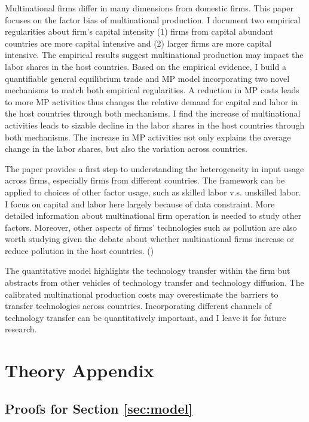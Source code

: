 \documentclass[notitlepage,11pt]{article}%
\begin{document}
Multinational firms differ in many dimensions from domestic firms. This paper
focuses on the factor bias of multinational production. I document two
empirical regularities about firm's capital intensity (1) firms from capital
abundant countries are more capital intensive and (2) larger firms are more
capital intensive. The empirical results suggest multinational production may
impact the labor shares in the host countries. Based on the empirical
evidence, I build a quantifiable general equilibrium trade and MP model
incorporating two novel mechanisms to match both empirical regularities. A
reduction in MP costs leads to more MP activities thus changes the relative
demand for capital and labor in the host countries through both mechanisms. I
find the increase of multinational activities leads to sizable decline in the
labor shares in the host countries through both mechanisms. The increase in MP
activities not only explains the average change in the labor shares, but also
the variation across countries.

The paper provides a first step to understanding the heterogeneity in input
usage across firms, especially firms from different countries. The framework
can be applied to choices of other factor usage, such as skilled labor v.s.
unskilled labor. I focus on capital and labor here largely because of data
constraint. More detailed information about multinational firm operation is
needed to study other factors. Moreover, other aspects of firms' technologies
such as pollution are also worth studying given the debate about whether
multinational firms increase or reduce pollution in the host countries.
(\cite{wang_foreign_2014})

The quantitative model highlights the technology transfer within the firm but
abstracts from other vehicles of technology transfer and technology diffusion.
The calibrated multinational production costs may overestimate the barriers to
transfer technologies across countries. Incorporating different channels of
technology transfer can be quantitatively important, and I leave it for future research.





\appendix{}

\section{Theory Appendix}

\subsection{Proofs for Section \ref{sec:model}}
\end{document}
